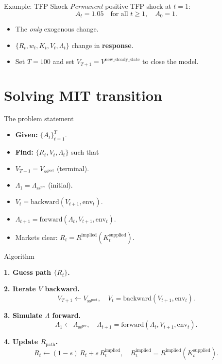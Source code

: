 \documentclass[10pt,aspectratio=169]{beamer}
\begin{document}
\begin{frame}{Example: TFP Shock}
  \emph{Permanent} positive TFP shock at $t = 1$:
  \[
    A_t = 1.05 \quad \text{for all } t \geq 1, \quad A_0 = 1.
  \]
  \begin{itemize}
    \item The \emph{only} exogenous change.
    \item $\{R_t, w_t, K_t, V_t, \Lambda_t\}$ change in \textbf{response}.
    \item Set $T = 100$ and set $V_{T+1} = V^\text{new\_steady\_state}$ to close the model.
  \end{itemize}
\end{frame}

\section[Solving MIT transition]{Solving MIT transition}

\begin{frame}{The problem statement}
  \begin{itemize}
    \item \textbf{Given:} $\{A_t\}_{t = 1}^T$.
    \item \textbf{Find:} $\{R_t, V_t, \Lambda_t\}$ such that
  \end{itemize}
  \begin{itemize}
    \item $V_{T+1} = V_{\mathrm{ss}^{\mathrm{post}}}$ (terminal).
    \item $\Lambda_1 = \Lambda_{\mathrm{ss}^{\mathrm{pre}}}$ (initial).
    \item $V_t = \text{backward}(V_{t+1}, \mathrm{env}_t)$.
    \item $\Lambda_{t+1} = \text{forward}(\Lambda_t, V_{t+1}, \mathrm{env}_t)$.
    \item Markets clear: $R_t = R^{\mathrm{implied}}(K_t^{\mathrm{supplied}})$.
  \end{itemize}
\end{frame}

\begin{frame}{Algorithm}

\textbf{1. Guess path $\{R_t\}$.}

\textbf{2. Iterate $V$ backward.}
\[
  V_{T+1} \leftarrow V_{\mathrm{ss}^{\mathrm{post}}}, \quad V_t = \text{backward}(V_{t+1}, \mathrm{env}_t).
\]

\textbf{3. Simulate $\Lambda$ forward.}
\[
  \Lambda_1 \leftarrow \Lambda_{\mathrm{ss}^{\mathrm{pre}}}, \quad \Lambda_{t+1} = \text{forward}(\Lambda_t, V_{t+1}, \mathrm{env}_t).
\]

\textbf{4. Update $R_{\mathrm{path}}$.}
\[
  R_t \leftarrow (1 - s)\,R_t + s\,R_t^{\mathrm{implied}}, \quad R_t^{\mathrm{implied}} = R^{\mathrm{implied}}(K_t^{\mathrm{supplied}}).
\]

\end{frame}
\end{document}
